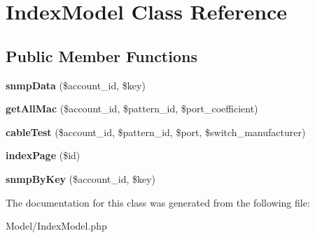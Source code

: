 \hypertarget{class_index_model}{\section{Index\-Model Class Reference}
\label{class_index_model}
}
\subsection*{Public Member Functions}
\begin{DoxyCompactItemize}
\item 
\hypertarget{class_index_model_a7af22211af9796a919c8a3ad0f7ece08}{{\bfseries snmp\-Data} (\$account\-\_\-id, \$key)}\label{class_index_model_a7af22211af9796a919c8a3ad0f7ece08}

\item 
\hypertarget{class_index_model_aba64dd68c8594e020114128ff8672615}{{\bfseries get\-All\-Mac} (\$account\-\_\-id, \$pattern\-\_\-id, \$port\-\_\-coefficient)}\label{class_index_model_aba64dd68c8594e020114128ff8672615}

\item 
\hypertarget{class_index_model_a9a191072641f963666154b9b15442535}{{\bfseries cable\-Test} (\$account\-\_\-id, \$pattern\-\_\-id, \$port, \$switch\-\_\-manufacturer)}\label{class_index_model_a9a191072641f963666154b9b15442535}

\item 
\hypertarget{class_index_model_a99d3df1e9eea9f8bbe8be04067299e1c}{{\bfseries index\-Page} (\$id)}\label{class_index_model_a99d3df1e9eea9f8bbe8be04067299e1c}

\item 
\hypertarget{class_index_model_a4cd11047d800383877ae3c2c4837d2de}{{\bfseries snmp\-By\-Key} (\$account\-\_\-id, \$key)}\label{class_index_model_a4cd11047d800383877ae3c2c4837d2de}

\end{DoxyCompactItemize}


The documentation for this class was generated from the following file\-:\begin{DoxyCompactItemize}
\item 
Model/Index\-Model.\-php\end{DoxyCompactItemize}
